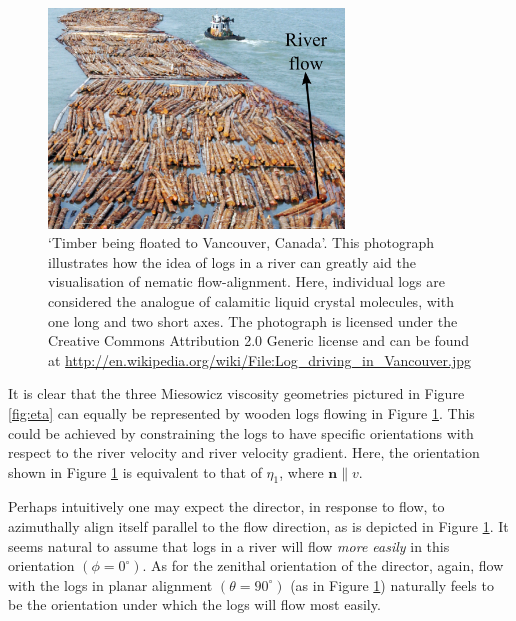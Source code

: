 \begin{figure}
\begin{center}
\includegraphics[width=0.7\textwidth]{Figures/Theory/river}
\end{center}
\caption[`Timber being floated to Vancouver, Canada']{\label{fig:logging} `Timber being floated to Vancouver, Canada'. This photograph illustrates how the idea of logs in a river can greatly aid the visualisation of nematic flow-alignment. Here, individual logs are considered the analogue of calamitic liquid crystal molecules, with one long and two short axes. The photograph is licensed under the Creative Commons Attribution 2.0 Generic license and can be found at \href{http://en.wikipedia.org/wiki/File:Log_driving_in_Vancouver.jpg}{http://en.wikipedia.org/wiki/File:Log\_driving\_in\_Vancouver.jpg}}
\end{figure}

It is clear that the three Miesowicz viscosity geometries pictured in Figure \ref{fig:eta} can equally be represented by wooden logs flowing in Figure \ref{fig:logging}. This could be achieved by constraining the logs to have specific orientations with respect to the river velocity and river velocity gradient. Here, the orientation shown in Figure \ref{fig:logging} is equivalent to that of $\eta_1$, where $\mathbf{n}\parallel v$. 

Perhaps intuitively one may expect the director, in response to flow, to azimuthally align itself parallel to the flow direction, as is depicted in Figure \ref{fig:logging}. It seems natural to assume that logs in a river will flow \textit{more easily} in this orientation $\left(\phi=0^{\circ}\right)$. As for the zenithal orientation of the director, again, flow with the logs in planar alignment $\left(\theta=90^{\circ}\right)$ (as in Figure \ref{fig:logging}) naturally feels to be the orientation under which the logs will flow most easily.

